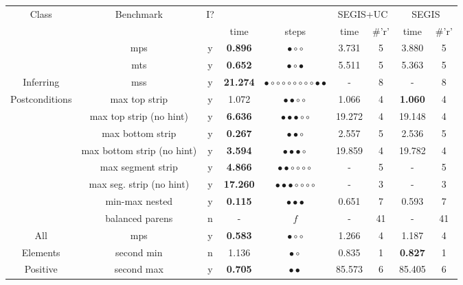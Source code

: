 	{\small
		\begin{longtable}[h]{|c|c|c|c|c||c|c||c|c|}
			\hline
			 \multirow{2}{*}{Class} &                \multirow{2}{*}{Benchmark} &                 \multirow{2}{*}{I?} &                 \multicolumn{2}{c||}{\setwogis} &                 \multicolumn{2}{c|}{SEGIS+UC} &                 \multicolumn{2}{c|}{SEGIS}\\ 
			\cline{4-9}
			 &   & & time & steps & time & \#'r' & time & \#'r' \\ 
			\hline
 & mps & y & {\bf 0.896} & $\bullet\circ\circ$ &  3.731  & 5 &  3.880 & 5 \\ 
 & mts & y & {\bf 0.652} & $\bullet\circ\bullet$ &  5.511  & 5 &  5.363 & 5 \\ 
Inferring & mss & y & {\bf 21.274} & $\bullet\circ\circ\circ\circ\circ\circ\circ\circ\bullet\bullet$ & -  & 8 & - & 8 \\ 
Postconditions & max top strip & y &  1.072 & $\bullet\bullet\circ\circ$ &  1.066  & 4 & {\bf 1.060} & 4 \\ 
 & max top strip (no hint) & y & {\bf 6.636} & $\bullet\bullet\bullet\circ\circ$ &  19.272  & 4 &  19.148 & 4 \\ 
 & max bottom strip & y & {\bf 0.267} & $\bullet\bullet\circ$ &  2.557  & 5 &  2.536 & 5 \\ 
 & max bottom strip (no hint) & y & {\bf 3.594} & $\bullet\bullet\bullet\circ$ &  19.859  & 4 &  19.782 & 4 \\ 
 & max segment strip & y & {\bf 4.866} & $\bullet\bullet\circ\circ\circ\circ$ & -  & 5 & - & 5 \\ 
 & max seg. strip (no hint) & y & {\bf 17.260} & $\bullet\bullet\bullet\circ\circ\circ\circ$ & -  & 3 & - & 3 \\ 
 & min-max nested & y & {\bf 0.115} & $\bullet\bullet\bullet$ &  0.651  & 7 &  0.593 & 7 \\ 
 & balanced parens & n & - & $f$ & -  & 41 & - & 41 \\ 
			\hline
All & mps & y & {\bf 0.583} & $\bullet\circ\circ$ &  1.266  & 4 &  1.187 & 4 \\ 
Elements & second min & n &  1.136 & $\bullet\circ$ &  0.835  & 1 & {\bf 0.827} & 1 \\ 
Positive & second max & y & {\bf 0.705} & $\bullet\bullet$ &  85.573  & 6 &  85.405 & 6 \\ 
			\hline

\end{longtable}}
